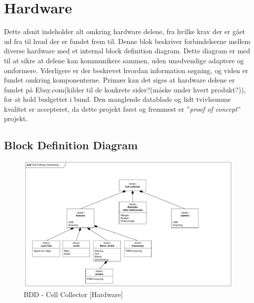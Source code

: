  \section{Hardware}
 Dette afsnit indeholder alt omkring hardware delene, fra hvilke krav der er gået ud fra til hvad der er fundet frem til. Denne blok beskriver forbindelserne mellem diverse hardware med et internal block definition diagram. Dette diagram er med til at sikre at delene kan kommunikere sammen, uden unødvendige adaptere og omformere. Yderligere er der beskrevet hvordan information søgning, og viden er fundet omkring komponenterne. Primær kan det siges at hardware delene er fundet på Ebay.com(kilder til de konkrete sider?(måske under hvert produkt?)), for at hold budgettet i bund. Den manglende datablade og lidt tvivlsomme kvalitet er accepteret, da dette projekt først og fremmest er  ”\textit{proof of concept}” projekt.
 
\subsection{Block Definition Diagram} 

\begin{figure}[H]
	\centering
	\includegraphics[width=1\textwidth]{pdf/BDD_Hardware_cropped.pdf}
	\caption{BDD - Cell Collector [Hardware]}
	\label{fig:bdd_Hardware}
\end{figure}

